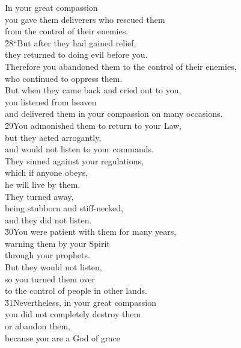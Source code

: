\begin{poetry}
\poeml In your great compassion \\
\poemll    you gave them deliverers who rescued them \\
\poemlll       from the control of their enemies. \\
\poeml \v{28}``But after they had gained relief, \\
\poemll    they returned to doing evil before you. \\
\poeml Therefore you abandoned them to the control of their enemies, \\
\poemll    who continued to oppress them. \\
\poeml But when they came back and cried out to you, \\
\poemll    you listened from heaven \\
\poemlll       and delivered them in your compassion on many occasions. \\
\poeml \v{29}You admonished them to return to your Law, \\
\poemll    but they acted arrogantly, \\
\poemlll       and would not listen to your commands. \\
\poeml They sinned against your regulations, \\
\poemll    which if anyone obeys, \\
\poemlll       he will live by them. \\
\poeml They turned away, \\
\poemll    being stubborn and stiff-necked, \\
\poemlll       and they did not listen. \\
\poeml \v{30}You were patient with them for many years, \\
\poemll    warning them by your Spirit \\
\poemlll       through your prophets. \\
\poeml But they would not listen, \\
\poemll    so you turned them over \\
\poemlll       to the control of people in other lands. \\
\poeml \v{31}Nevertheless, in your great compassion \\
\poemll    you did not completely destroy them \\
\poemlll       or abandon them, \\
\poeml because you are a God of grace \\

\end{poetry}
